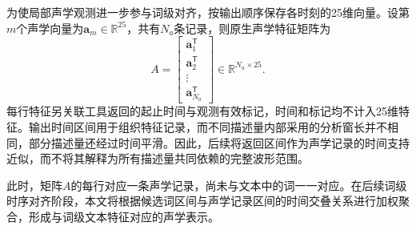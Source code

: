 为使局部声学观测进一步参与词级对齐，按输出顺序保存各时刻的25维向量。设第$m$个声学向量为$\boldsymbol a_m\in\mathbb R^{25}$，共有$N_a$条记录，则原生声学特征矩阵为
\begin{equation}
    A=\begin{bmatrix}
        \boldsymbol a_1^{\mathsf T}\\
        \boldsymbol a_2^{\mathsf T}\\
        \vdots\\
        \boldsymbol a_{N_a}^{\mathsf T}
    \end{bmatrix}\in\mathbb R^{N_a\times25}.
    \label{eq:p1_audio_features}
\end{equation}
每行特征另关联工具返回的起止时间与观测有效标记，时间和标记均不计入25维特征。输出时间区间用于组织特征记录，而不同描述量内部采用的分析窗长并不相同，部分描述量还经过时间平滑。因此，后续将返回区间作为声学记录的时间支持近似，而不将其解释为所有描述量共同依赖的完整波形范围。

此时，矩阵$A$的每行对应一条声学记录，尚未与文本中的词一一对应。在后续词级时序对齐阶段，本文将根据候选词区间与声学记录区间的时间交叠关系进行加权聚合，形成与词级文本特征对应的声学表示。
